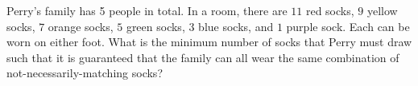 Perry's family has 5 people in total. In a room, there are $11$ red socks, $9$ yellow socks, $7$ orange socks, $5$ green socks, $3$ blue socks, and $1$ purple sock. Each can be worn on either foot. What is the minimum number of socks that Perry must draw such that it is guaranteed that the family can all wear the same combination of not-necessarily-matching socks?
